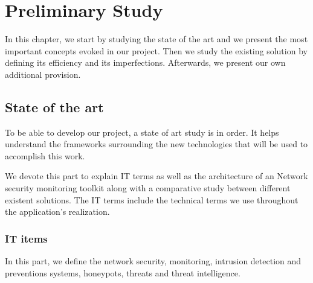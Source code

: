 \chapter{Preliminary Study}

\renewcommand{\chaptername}{Chapter}

In this chapter, we start by studying the state of the art and we present the most important concepts evoked in  our project. Then we study the existing solution by defining its efficiency and its imperfections. Afterwards, we present our own additional provision.



\section{State of the art}

To be able to develop our project, a state of art study is in order. It helps understand the frameworks surrounding the new technologies that will be used to accomplish this work.

We devote this part to explain IT terms as well as the architecture of an Network security monitoring toolkit along with a comparative study between different existent solutions. The IT terms include the technical terms we use throughout the application's realization.


\subsection{IT items}
In this part, we define the network security, monitoring, intrusion detection and preventions systems, honeypots, threats and threat intelligence.

